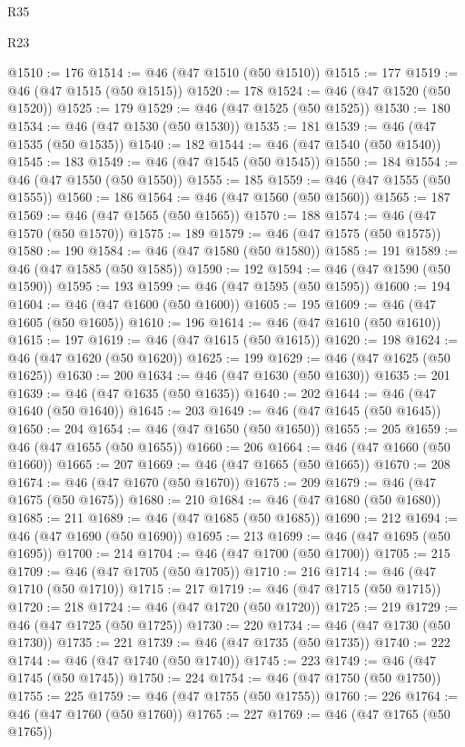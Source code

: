 \begin{lexlean}{R35}
\begin{lexlean}{R23}
\begin{coremodule}
{{{{{{{{{{{{{{{{{{{{{@1510 := 176
@1514 := @46 (@47 @1510 (@50 @1510))
@1515 := 177
@1519 := @46 (@47 @1515 (@50 @1515))
@1520 := 178
@1524 := @46 (@47 @1520 (@50 @1520))
@1525 := 179
@1529 := @46 (@47 @1525 (@50 @1525))
@1530 := 180
@1534 := @46 (@47 @1530 (@50 @1530))
@1535 := 181
@1539 := @46 (@47 @1535 (@50 @1535))
@1540 := 182
@1544 := @46 (@47 @1540 (@50 @1540))
@1545 := 183
@1549 := @46 (@47 @1545 (@50 @1545))
@1550 := 184
@1554 := @46 (@47 @1550 (@50 @1550))
@1555 := 185
@1559 := @46 (@47 @1555 (@50 @1555))
@1560 := 186
@1564 := @46 (@47 @1560 (@50 @1560))
@1565 := 187
@1569 := @46 (@47 @1565 (@50 @1565))
@1570 := 188
@1574 := @46 (@47 @1570 (@50 @1570))
@1575 := 189
@1579 := @46 (@47 @1575 (@50 @1575))
@1580 := 190
@1584 := @46 (@47 @1580 (@50 @1580))
@1585 := 191
@1589 := @46 (@47 @1585 (@50 @1585))
@1590 := 192
@1594 := @46 (@47 @1590 (@50 @1590))
@1595 := 193
@1599 := @46 (@47 @1595 (@50 @1595))
@1600 := 194
@1604 := @46 (@47 @1600 (@50 @1600))
@1605 := 195
@1609 := @46 (@47 @1605 (@50 @1605))
@1610 := 196
@1614 := @46 (@47 @1610 (@50 @1610))
@1615 := 197
@1619 := @46 (@47 @1615 (@50 @1615))
@1620 := 198
@1624 := @46 (@47 @1620 (@50 @1620))
@1625 := 199
@1629 := @46 (@47 @1625 (@50 @1625))
@1630 := 200
@1634 := @46 (@47 @1630 (@50 @1630))
@1635 := 201
@1639 := @46 (@47 @1635 (@50 @1635))
@1640 := 202
@1644 := @46 (@47 @1640 (@50 @1640))
@1645 := 203
@1649 := @46 (@47 @1645 (@50 @1645))
@1650 := 204
@1654 := @46 (@47 @1650 (@50 @1650))
@1655 := 205
@1659 := @46 (@47 @1655 (@50 @1655))
@1660 := 206
@1664 := @46 (@47 @1660 (@50 @1660))
@1665 := 207
@1669 := @46 (@47 @1665 (@50 @1665))
@1670 := 208
@1674 := @46 (@47 @1670 (@50 @1670))
@1675 := 209
@1679 := @46 (@47 @1675 (@50 @1675))
@1680 := 210
@1684 := @46 (@47 @1680 (@50 @1680))
@1685 := 211
@1689 := @46 (@47 @1685 (@50 @1685))
@1690 := 212
@1694 := @46 (@47 @1690 (@50 @1690))
@1695 := 213
@1699 := @46 (@47 @1695 (@50 @1695))
@1700 := 214
@1704 := @46 (@47 @1700 (@50 @1700))
@1705 := 215
@1709 := @46 (@47 @1705 (@50 @1705))
@1710 := 216
@1714 := @46 (@47 @1710 (@50 @1710))
@1715 := 217
@1719 := @46 (@47 @1715 (@50 @1715))
@1720 := 218
@1724 := @46 (@47 @1720 (@50 @1720))
@1725 := 219
@1729 := @46 (@47 @1725 (@50 @1725))
@1730 := 220
@1734 := @46 (@47 @1730 (@50 @1730))
@1735 := 221
@1739 := @46 (@47 @1735 (@50 @1735))
@1740 := 222
@1744 := @46 (@47 @1740 (@50 @1740))
@1745 := 223
@1749 := @46 (@47 @1745 (@50 @1745))
@1750 := 224
@1754 := @46 (@47 @1750 (@50 @1750))
@1755 := 225
@1759 := @46 (@47 @1755 (@50 @1755))
@1760 := 226
@1764 := @46 (@47 @1760 (@50 @1760))
@1765 := 227
@1769 := @46 (@47 @1765 (@50 @1765))
}}}}}}}}}}}}}}}}}}}}}
\end{coremodule}
\end{lexlean}
\end{lexlean}
